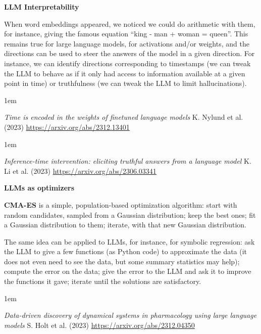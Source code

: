\documentclass[a5paper]{article}
\let\d\textbf
\newenvironment{reference}{%
  \medskip\goodbreak
  \parskip 0pt
  \raggedright
  \leftskip 1em
  \obeylines
}{\par\medskip\goodbreak}
\def\section#1{\clearpage{\vspace*{0cm}\LARGE\centering\bfseries #1\par\bigskip\bigskip}}
\def\subsection#1{{\par\bigskip\goodbreak\large\bfseries #1\par}}
\begin{document}
\subsection{LLM Interpretability}

When word embeddings appeared, we noticed we could do arithmetic with them,
for instance, giving the famous equation ``king - man + woman = queen''.
This remains true for large language models, for activations and/or weights,
and the directions can be used to steer
the answers of the model in a given direction. For instance,
we can identify directions corresponding to timestamps
(we can tweak the LLM to behave as if it only had access to information available at a given point in time)
or truthfulness (we can tweak the LLM to limit hallucinations).

\begin{reference}
  \emph{Time is encoded in the weights  of finetuned language models}
  K. Nylund et al. (2023)
  \url{https://arxiv.org/abs/2312.13401}
\end{reference}

\begin{reference}
  \emph{Inference-time intervention: eliciting  truthful answers from a language model}
  K. Li et al. (2023)
  \url{https://arxiv.org/abs/2306.03341}
\end{reference}

\section{Large Language Models}
\subsection{LLMs as optimizers}

\d{CMA-ES} is a simple, population-based optimization algorithm:
start with random candidates, sampled from a Gaussian distribution;
keep the best ones;
fit a Gaussian distribution to them;
iterate, with that new Gaussian distribution.

The same idea can be applied to LLMs, for instance, for symbolic regression:
ask the LLM to give a few functions (as Python code) to approximate the data
(it does not even need to see the data, but some summary statistics may help);
compute the error on the data;
give the error to the LLM and ask it to improve the functions it gave;
iterate until the solutions are satisfactory.

\begin{reference}
  \emph{Data-driven discovery of dynamical systems  in pharmacology using large language models}
  S. Holt et al. (2023)
  \url{https://arxiv.org/abs/2312.04350}
\end{reference}
\end{document}
